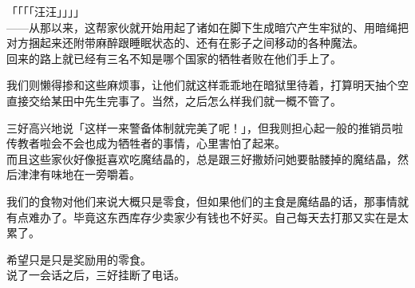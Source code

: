 「「「「汪汪」」」」\\

——从那以来，这帮家伙就开始用起了诸如在脚下生成暗穴产生牢狱的、用暗绳把对方捆起来还附带麻醉跟睡眠状态的、还有在影子之间移动的各种魔法。\\

回来的路上就已经有三名不知是哪个国家的牺牲者败在他们手上了。

我们则懒得掺和这些麻烦事，让他们就这样乖乖地在暗狱里待着，打算明天抽个空直接交给某田中先生完事了。当然，之后怎么样我们就一概不管了。

三好高兴地说「这样一来警备体制就完美了呢！」，但我则担心起一般的推销员啦传教者啦会不会也成为牺牲者的事情，心里害怕了起来。\\

而且这些家伙好像挺喜欢吃魔结晶的，总是跟三好撒娇问她要骷髅掉的魔结晶，然后津津有味地在一旁嚼着。

我们的食物对他们来说大概只是零食，但如果他们的主食是魔结晶的话，那事情就有点难办了。毕竟这东西库存少卖家少有钱也不好买。自己每天去打那又实在是太累了。

希望只是只是奖励用的零食。\\

说了一会话之后，三好挂断了电话。\\

